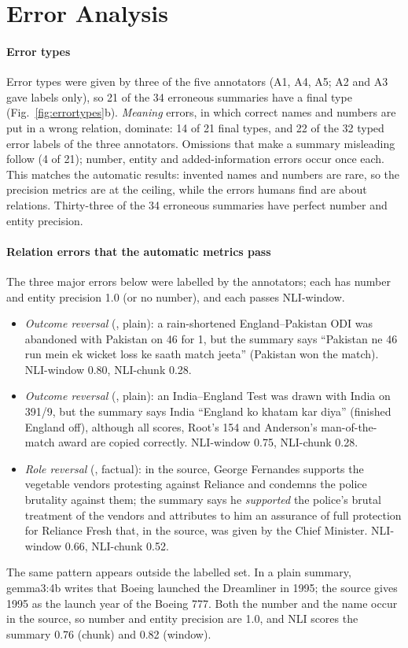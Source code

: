 \section{Error Analysis}
\label{sec:errors}

\paragraph{Error types} Error types were given by three of the five annotators (A1, A4, A5; A2 and A3 gave labels only), so 21 of the 34 erroneous summaries have a final type (Fig.~\ref{fig:errortypes}b). \emph{Meaning} errors, in which correct names and numbers are put in a wrong relation, dominate: 14 of 21 final types, and 22 of the 32 typed error labels of the three annotators. Omissions that make a summary misleading follow (4 of 21); number, entity and added-information errors occur once each. This matches the automatic results: invented names and numbers are rare, so the precision metrics are at the ceiling, while the errors humans find are about relations. Thirty-three of the 34 erroneous summaries have perfect number and entity precision.

\paragraph{Relation errors that the automatic metrics pass} The three major errors below were labelled by the annotators; each has number and entity precision 1.0 (or no number), and each passes NLI-window.
\begin{itemize}
  \item \emph{Outcome reversal} (, plain): a rain-shortened England--Pakistan ODI was abandoned with Pakistan on 46 for 1, but the summary says ``Pakistan ne 46 run mein ek wicket loss ke saath match jeeta'' (Pakistan won the match). NLI-window 0.80, NLI-chunk 0.28.
  \item \emph{Outcome reversal} (, plain): an India--England Test was drawn with India on 391/9, but the summary says India ``England ko khatam kar diya'' (finished England off), although all scores, Root's 154 and Anderson's man-of-the-match award are copied correctly. NLI-window 0.75, NLI-chunk 0.28.
  \item \emph{Role reversal} (, factual): in the source, George Fernandes supports the vegetable vendors protesting against Reliance and condemns the police brutality against them; the summary says he \emph{supported} the police's brutal treatment of the vendors and attributes to him an assurance of full protection for Reliance Fresh that, in the source, was given by the Chief Minister. NLI-window 0.66, NLI-chunk 0.52.
\end{itemize}
The same pattern appears outside the labelled set. In a  plain summary, gemma3:4b writes that Boeing launched the Dreamliner in 1995; the source gives 1995 as the launch year of the Boeing 777. Both the number and the name occur in the source, so number and entity precision are 1.0, and NLI scores the summary 0.76 (chunk) and 0.82 (window).

